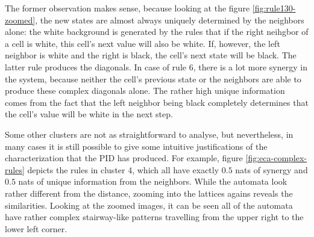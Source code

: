 \documentclass[12pt]{article}
\begin{document}
The former observation makes sense, because looking at the figure \ref{fig:rule130-zoomed}, the new states are almost always uniquely determined by the neighbors alone: the white background is generated by the rules that if the right neihgbor of a cell is white, this cell's next value will also be white. If, however, the left neighbor is white and the right is black, the cell's next state will be black. The latter rule produces the diagonals. In case of rule 6, there is a lot more synergy in the system, because neither the cell's previous state or the neighbors are able to produce these complex diagonals alone. The rather high unique information comes from the fact that the left neighbor being black completely determines that the cell's value will be white in the next step. 

Some other clusters are not as straightforward to analyse, but nevertheless, in many cases it is still possible to give some intuitive justifications of the characterization that the PID has produced. For example, figure \ref{fig:eca-complex-rules} depicts the rules in cluster 4, which all have exactly $0.5$ nats of synergy and $0.5$ nats of unique information from the neighbors. While the automata look rather different from the distance, zooming into the lattices agains reveals the similarities. Looking at the zoomed images, it can be seen all of the automata have rather complex stairway-like patterns travelling from the upper right to the lower left corner. 
\end{document}
